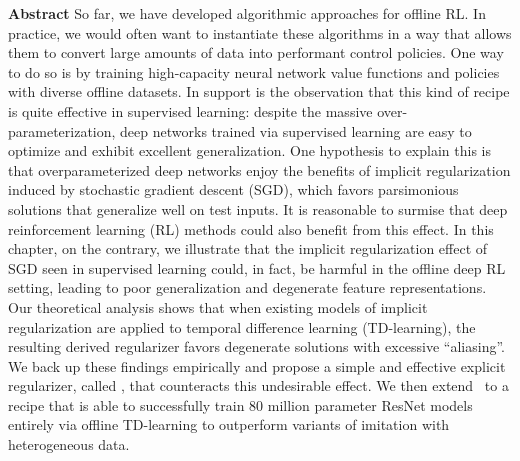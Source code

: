 \documentclass[../thesis.tex]{subfiles}
\begin{document}

\vspace{-0.4cm}
\begin{AIbox}{\large{\textbf{Abstract}}}
\vspace{4mm}
So far, we have developed algorithmic approaches for offline RL. In practice, we would often want to instantiate these algorithms in a way that allows them to convert large amounts of data into performant control policies. One way to do so is by training high-capacity neural network value functions and policies with diverse offline datasets. In support is the observation that this kind of recipe is quite effective in supervised learning: despite the massive over-parameterization, deep networks trained via supervised learning are easy to optimize and exhibit excellent generalization. One hypothesis to explain this is that overparameterized deep networks enjoy the benefits of implicit regularization induced by stochastic gradient descent (SGD), which favors parsimonious solutions that generalize well on test inputs. It is reasonable to surmise that deep reinforcement learning (RL) methods could also benefit from this effect.
In this chapter, on the contrary, we illustrate that the implicit regularization effect of SGD seen in supervised learning could, in fact, be harmful in the offline deep RL setting, leading to poor generalization and degenerate feature representations. Our theoretical analysis shows that when existing models of implicit regularization are applied to temporal difference learning (TD-learning), the resulting derived regularizer favors degenerate solutions with excessive ``aliasing''. We back up these findings empirically and propose a simple and effective explicit regularizer, called \drmethodname, that counteracts this undesirable effect. We then extend \drmethodname\ to a recipe that is able to successfully train 80 million parameter ResNet models entirely via offline TD-learning to outperform variants of imitation with heterogeneous data.

\end{AIbox}
\end{document}
